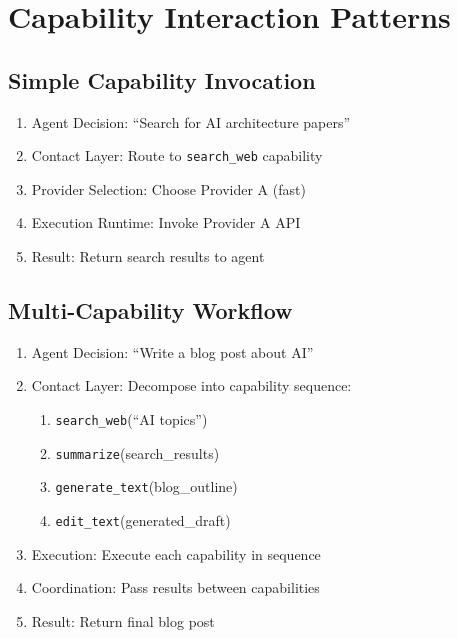 
\appendix

\section{Capability Interaction Patterns}

\subsection{Simple Capability Invocation}

\begin{enumerate}[label=\arabic*.]
\item Agent Decision: ``Search for AI architecture papers''
\item Contact Layer: Route to \texttt{search\_web} capability
\item Provider Selection: Choose Provider A (fast)
\item Execution Runtime: Invoke Provider A API
\item Result: Return search results to agent
\end{enumerate}

\subsection{Multi-Capability Workflow}

\begin{enumerate}[label=\arabic*.]
\item Agent Decision: ``Write a blog post about AI''
\item Contact Layer: Decompose into capability sequence:
  \begin{enumerate}[label=\alph*.]
  \item \texttt{search\_web}(``AI topics'')
  \item \texttt{summarize}(search\_results)
  \item \texttt{generate\_text}(blog\_outline)
  \item \texttt{edit\_text}(generated\_draft)
  \end{enumerate}
\item Execution: Execute each capability in sequence
\item Coordination: Pass results between capabilities
\item Result: Return final blog post
\end{enumerate}

